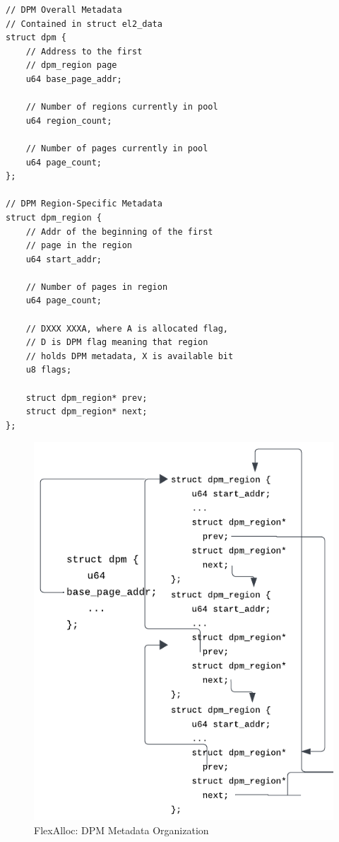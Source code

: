 \begin{verbatim}
// DPM Overall Metadata
// Contained in struct el2_data
struct dpm {
    // Address to the first
    // dpm_region page
    u64 base_page_addr; 

    // Number of regions currently in pool
    u64 region_count;

    // Number of pages currently in pool
    u64 page_count;     
};

// DPM Region-Specific Metadata
struct dpm_region {
    // Addr of the beginning of the first
    // page in the region
    u64 start_addr;

    // Number of pages in region
    u64 page_count;

    // DXXX XXXA, where A is allocated flag,
    // D is DPM flag meaning that region
    // holds DPM metadata, X is available bit
    u8 flags; 

    struct dpm_region* prev;
    struct dpm_region* next;
};
\end{verbatim}

\begin{figure}[h!tbp]
\centering
\captionsetup{justification=centering}
\includegraphics{dpmmetadata}
\caption{FlexAlloc: DPM Metadata Organization}
\label{fig:dpmmetadata}
\end{figure}

